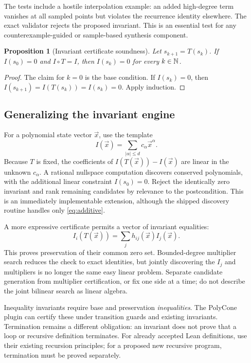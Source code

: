 \documentclass[11pt,a4paper]{article}
\newtheorem{proposition}{Proposition}[section]
\begin{document}
The tests include a hostile interpolation example: an added high-degree term
vanishes at all sampled points but violates the recurrence identity elsewhere.
The exact validator rejects the proposed invariant. This is an essential test
for any counterexample-guided or sample-based synthesis component.

\begin{proposition}[Invariant certificate soundness]
Let $s_{k+1}=T(s_k)$. If $I(s_0)=0$ and $I\circ T=I$, then
$I(s_k)=0$ for every $k\in\mathbb{N}$.
\end{proposition}
\begin{proof}
The claim for $k=0$ is the base condition. If $I(s_k)=0$, then
$I(s_{k+1})=I(T(s_k))=I(s_k)=0$. Apply induction.
\end{proof}

\subsection{Generalizing the invariant engine}

For a polynomial state vector $\vec x$, use the template
\[
 I(\vec x)=\sum_{|\alpha|\leq d}c_\alpha\vec x^\alpha.
\]
Because $T$ is fixed, the coefficients of $I(T(\vec x))-I(\vec x)$ are linear
in the unknown $c_\alpha$. A rational nullspace computation discovers conserved
polynomials, with the additional linear constraint $I(s_0)=0$. Reject the
identically zero invariant and rank remaining candidates by relevance to the
postcondition. This is an immediately implementable extension, although the
shipped discovery routine handles only \eqref{eq:additive}.

A more expressive certificate permits a vector of invariant equalities:
\[
 I_i(T(\vec x))=\sum_j h_{ij}(\vec x)I_j(\vec x).
\]
This proves preservation of their common zero set. Bounded-degree multiplier
search reduces the check to exact identities, but jointly discovering the
$I_j$ and multipliers is no longer the same easy linear problem. Separate
candidate generation from multiplier certification, or fix one side at a time;
do not describe the joint bilinear search as linear algebra.

Inequality invariants require base and preservation \emph{inequalities}. The
PolyCone plugin can certify these under transition guards and existing
invariants. Termination remains a different obligation: an invariant does not
prove that a loop or recursive definition terminates. For already accepted
Lean definitions, use their existing recursion principles; for a proposed new
recursive program, termination must be proved separately.
\end{document}
